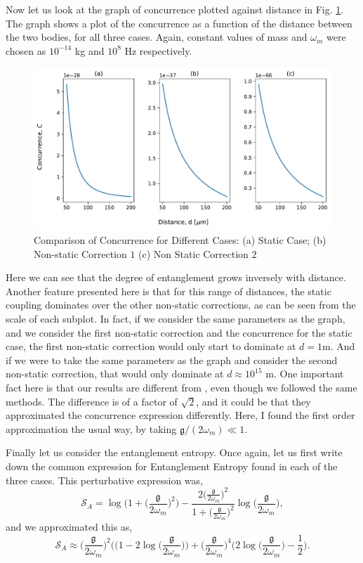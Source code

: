 \documentclass[12pt,a4paper]{report}
\theoremstyle{plain}
\theoremstyle{definition}
\theoremstyle{remark}
\begin{document}
Now let us look at the graph of concurrence plotted against distance in Fig. \ref{fig: Concurrence}. The graph shows a plot of the concurrence as a function of the distance between the two bodies, for all three cases. Again, constant values of mass and $\omega_m$ were chosen as $10^{-14}$ kg and $10^8$ Hz respectively.
\begin{figure}[h]
    \centering
    \includegraphics[width=15cm]{ConcCases.pdf}
    \caption{Comparison of Concurrence for Different Cases:  (a) Static Case; (b) Non-static Correction $1$ (c) Non Static Correction $2$}
    \label{fig: Concurrence}
\end{figure}
Here we can see that the degree of entanglement grows inversely with distance. Another feature presented here is that for this range of distances, the static coupling dominates over the other non-static corrections, as can be seen from the scale of each subplot. In fact, if we consider the same parameters as the graph, and we consider the first non-static correction and the concurrence for the static case, the first non-static correction would only start to dominate at $d=1$m. And if we were to take the same parameters as the graph and consider the second non-static correction, that would only dominate at $d\approx10^{15}$ m. One important fact here is that our results are different from \citet{Bose_2022}, even though we followed the same methods. The difference is of a factor of $\sqrt{2}$, and it could be that they approximated the concurrence expression differently. Here, I found the first order approximation the usual way, by taking $\mathfrak{g}/(2\omega_{m}) \ll 1$.

Finally let us consider the entanglement entropy. Once again, let us first write down the common expression for Entanglement Entropy found in each of the three cases. This perturbative expression was,
\begin{equation}
    \mathcal{S}_A = \log\Bigg(1+ \Big(\frac{\mathfrak{g}}{2\omega_{m}}\Big)^2\Bigg) - \frac{2\Big(\frac{\mathfrak{g}}{2\omega_{m}}\Big)^2}{1+\Big(\frac{\mathfrak{g}}{2\omega_{m}}\Big)^2}\log\Big(\frac{\mathfrak{g}}{2\omega_{m}}\Big),
\end{equation}
and we approximated this as,
\begin{equation}
     \mathcal{S}_A \approx \Big(\frac{\mathfrak{g}}{2\omega_{m}}\Big)^2 \Big((1 - 2\log\Big(\frac{\mathfrak{g}}{2\omega_{m}}\Big)\Big) + \Big(\frac{\mathfrak{g}}{2\omega_{m}}\Big)^4 \Big(2\log\Big(\frac{\mathfrak{g}}{2\omega_{m}}\Big) - \frac{1}{2}\Big).
\end{equation}
\end{document}
